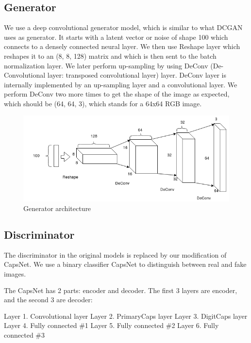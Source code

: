 \documentclass{vldb}
\begin{document}
\subsection{Generator} %
\label{sec:generator}
We use a deep convolutional generator model, which is similar to what DCGAN uses as generator. It starts with a latent vector or noise of shape 100 which connects to a densely connected neural layer. We then use Reshape layer which reshapes it to an (8, 8, 128) matrix and which is then sent to the batch normalization layer. We later perform up-sampling by using DeConv (De-Convolutional layer: transposed convolutional layer) layer. DeConv layer is internally implemented by an up-sampling layer and a convolutional layer. We perform DeConv two more times to get the shape of the image as expected, which should be (64, 64, 3), which stands for a 64x64 RGB image.
\begin{figure}[H]
\centering\includegraphics[width=\linewidth]{../Final_Report/images/Generator.png}
\caption{Generator architecture}
\label{fig:generator}
\end{figure} 



\subsection{Discriminator} %
\label{sec:discriminator}
The discriminator in the original models is replaced by our modification of CapsNet. We use a binary classifier CapsNet to distinguish between real and fake images. 

\par\bigskip
The CapsNet has 2 parts: encoder and decoder. The first 3 layers are encoder, and the second 3 are decoder:

Layer 1. Convolutional layer
Layer 2. PrimaryCaps layer
Layer 3. DigitCaps layer
Layer 4. Fully connected \#1
Layer 5. Fully connected \#2
Layer 6. Fully connected \#3
\end{document}
